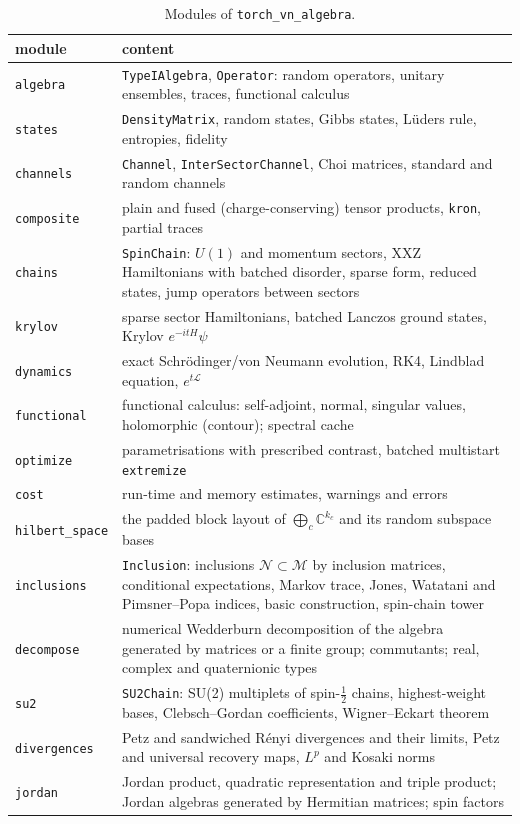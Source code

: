 \documentclass[11pt]{article}
\newcommand{\C}{\mathbb{C}}
\newcommand{\M}{\mathcal{M}}
\begin{document}
\begin{table}[h]
\centering\small
\begin{tabular}{lp{}}
\toprule
module & content \\
\midrule
\texttt{algebra} & \texttt{TypeIAlgebra}, \texttt{Operator}: random operators, unitary ensembles, traces,
functional calculus\\
\texttt{states} & \texttt{DensityMatrix}, random states, Gibbs states, Lüders rule, entropies, fidelity\\
\texttt{channels} & \texttt{Channel}, \texttt{InterSectorChannel}, Choi matrices, standard and random channels\\
\texttt{composite} & plain and fused (charge-conserving) tensor products, \texttt{kron}, partial traces\\
\texttt{chains} & \texttt{SpinChain}: $U(1)$ and momentum sectors, XXZ Hamiltonians with batched disorder,
sparse form, reduced states, jump operators between sectors\\
\texttt{krylov} & sparse sector Hamiltonians, batched Lanczos ground states, Krylov $e^{-itH}\psi$\\
\texttt{dynamics} & exact Schrödinger/von Neumann evolution, RK4, Lindblad equation, $e^{t\mathcal L}$\\
\texttt{functional} & functional calculus: self-adjoint, normal, singular values, holomorphic (contour); spectral cache\\
\texttt{optimize} & parametrisations with prescribed contrast, batched multistart \texttt{extremize}\\
\texttt{cost} & run-time and memory estimates, warnings and errors\\
\texttt{hilbert\_space} & the padded block layout of $\bigoplus_c\C^{k_c}$ and its random subspace bases\\
\texttt{inclusions} & \texttt{Inclusion}: inclusions $\mathcal N\subset\M$ by inclusion matrices, conditional expectations,
Markov trace, Jones, Watatani and Pimsner--Popa indices, basic construction, spin-chain tower\\
\texttt{decompose} & numerical Wedderburn decomposition of the algebra generated by matrices or a finite group; commutants;
real, complex and quaternionic types\\
\texttt{su2} & \texttt{SU2Chain}: SU(2) multiplets of spin-$\frac12$ chains, highest-weight bases, Clebsch--Gordan
coefficients, Wigner--Eckart theorem\\
\texttt{divergences} & Petz and sandwiched Rényi divergences and their limits, Petz and universal recovery maps,
$L^p$ and Kosaki norms\\
\texttt{jordan} & Jordan product, quadratic representation and triple product; Jordan algebras generated by
Hermitian matrices; spin factors\\
\bottomrule
\end{tabular}
\caption{Modules of \texttt{torch\_vn\_algebra}.}
\label{tab:modules}
\end{table}
\end{document}
